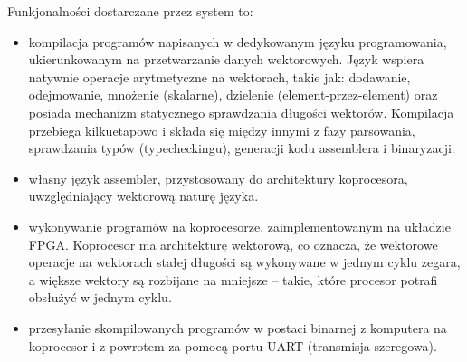 Funkjonalności dostarczane przez system to:
\begin{itemize}
  \item kompilacja programów napisanych w dedykowanym języku programowania, ukierunkowanym na przetwarzanie danych wektorowych. Język wspiera natywnie operacje arytmetyczne na wektorach, takie jak: dodawanie, odejmowanie, mnożenie (skalarne), dzielenie (element-przez-element) oraz posiada mechanizm statycznego sprawdzania długości wektorów. Kompilacja przebiega kilkuetapowo i składa się między innymi z fazy parsowania, sprawdzania typów (typecheckingu), generacji kodu assemblera i binaryzacji.
  \item własny język assembler, przystosowany do architektury koprocesora, uwzględniający wektorową naturę języka.
  \item wykonywanie programów na koprocesorze, zaimplementowanym na układzie FPGA. Koprocesor ma architekturę wektorową, co oznacza, że wektorowe operacje na wektorach stałej długości są wykonywane w jednym cyklu zegara, a większe wektory są rozbijane na mniejsze -- takie, które procesor potrafi obsłużyć w jednym cyklu.
  \item przesyłanie skompilowanych programów w postaci binarnej z komputera na koprocesor i z powrotem za pomocą portu UART (transmisja szeregowa).
\end{itemize}
